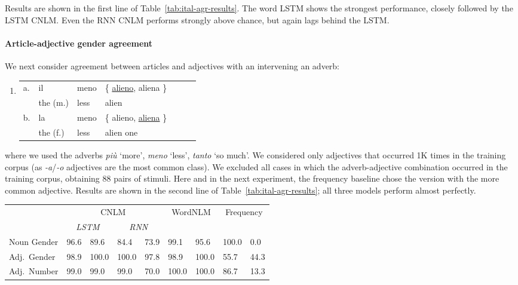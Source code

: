 Results are shown in the first line of
Table~\ref{tab:ital-agr-results}.  The word LSTM shows the strongest
performance, closely followed by the LSTM CNLM.  Even the RNN CNLM
performs strongly above chance, but again lags behind the LSTM.

\paragraph{Article-adjective gender agreement}
We next consider agreement between articles and adjectives with an intervening an adverb:
\begin{enumerate}[label={(\arabic*)}]
	\item 
		\begin{tabular}[t]{lllllll}
	a. & il & meno & \{ \underline{alieno}, aliena \} \\
   &  the (m.)& less & alien  \\
	b. & la & meno & \{ alieno, \underline{aliena} \} \\
    &the (f.)& less & alien one \\
\end{tabular}
\end{enumerate}
where we used the adverbs \emph{pi{\`u}} `more', \emph{meno} `less',
\emph{tanto} `so much'. We considered only adjectives that occurred 1K
times in the training corpus (as \emph{-a}/\emph{-o} adjectives are
the most common class). We excluded all cases in which the
adverb-adjective combination occurred in the training corpus, obtaining 88 pairs of stimuli. %
Here and in the next experiment, the frequency baseline chose the version with the more common adjective.
Results are shown in the second line of Table~\ref{tab:ital-agr-results}; all three models perform almost perfectly.

\begin{table*}[t]
  \begin{center}
    \begin{tabular}{l|ll|ll|ll|ll}
	    & \multicolumn{4}{c|}{CNLM} & \multicolumn{2}{c|}{\multirow{2}{*}{WordNLM}}  & \multicolumn{2}{c}{\multirow{2}{*}{Frequency}}\\
	    &\multicolumn{2}{c|}{\emph{LSTM}}&\multicolumn{2}{c|}{\emph{RNN}} & & & \\ \hline
	    Noun Gender & 96.6&89.6  & 84.4&73.9 & 99.1&95.6 & 100.0 & 0.0\\
	    Adj.~Gender & 98.9&100.0 & 100.0&97.8 & 98.9&100.0 & 55.7 & 44.3 \\
	    Adj.~Number & 99.0&99.0 & 99.0&70.0 & 100.0&100.0 & 86.7 & 13.3 \\
    \end{tabular}
  \end{center}
	\caption{\label{tab:ital-agr-results} Italian agreement results. For each model and test, we report percentage accuracy on two stimulus classes (masculine/feminine for gender, singular/plural for number).}
\end{table*}

